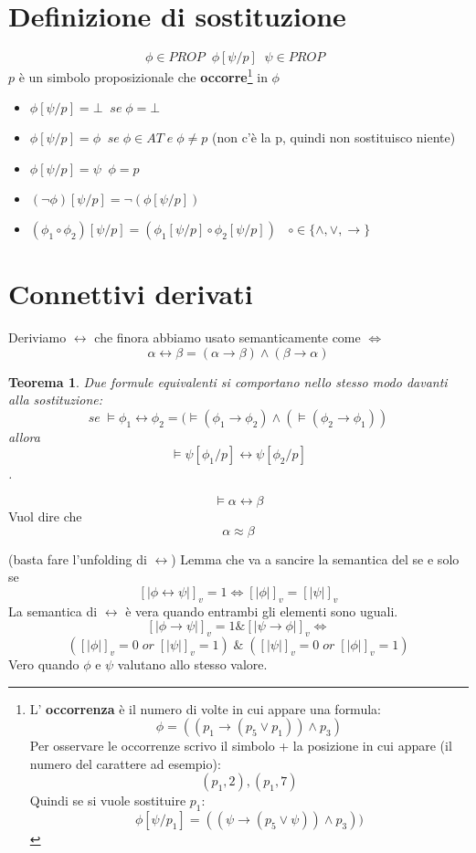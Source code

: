 \documentclass{article}
\newtheorem{theorem}{Teorema}
\theoremstyle{break}
\theoremstyle{break}
\theoremstyle{break}
\theoremstyle{break}
\begin{document}
\section{Definizione di sostituzione}
\begin{definition}
   \[
       \phi \in PROP\;\; \phi[\psi/p]\;\; \psi \in PROP\;\;
   \]  
   \( p \) è un simbolo proposizionale che \textbf{occorre}\footnote{L' \textbf{occorrenza} è il numero di volte
   in cui appare una formula:
\[
   \phi=((p_1 \to (p_5 \vee p_1))\wedge p_3)
\] 
Per osservare le occorrenze scrivo il simbolo + la posizione in cui appare (il numero del carattere ad esempio):
\[
    (p_1, 2), (p_1, 7)
\]
Quindi se si vuole sostituire \( p_1 \): \[ \phi[\psi/p_1] = ((\psi \to (p_5 \vee \psi))\wedge p_3)) \]
} in \( \phi \)
\begin{itemize}
    \item \( \phi[\psi/p] = \bot\;\; se\; \phi = \bot \)
    \item \( \phi[\psi/p] = \phi\;\; se\;\phi \in AT\; e\; \phi \neq p \) (non c'è la p, quindi non sostituisco niente)
    \item \( \phi[\psi/p] = \psi\;\; \phi = p \) 
    \item \( (\neg \phi)[\psi/p] =  \neg (\phi[\psi/p])\) 
    \item \( (\phi_1 \circ \phi_2)[\psi/p]=(\phi_1[\psi/p] \circ \phi_2[\psi/p]) \)  \(\;\; \circ \in  \{ \wedge, \vee, \to  \} \) 
\end{itemize}
\end{definition}

\section{Connettivi derivati}
Deriviamo \( \leftrightarrow \) che finora abbiamo usato semanticamente come \( \Leftrightarrow \) 
\[
\alpha \leftrightarrow \beta = (\alpha \to \beta) \wedge (\beta \to \alpha)
\] 
\begin{theorem}
    Due formule equivalenti si comportano nello stesso modo davanti alla sostituzione:
    \[
    se\; \models \phi_1 \leftrightarrow \phi_2 = (\models (\phi_1 \to \phi_2) \wedge (\models (\phi_2 \to \phi_1))
    \] 
    allora
    \[
        \models \psi[\phi_1/p] \leftrightarrow \psi[\phi_2/p]
    \].
\end{theorem}
\[
    \models \alpha \leftrightarrow \beta
\] Vuol dire che
\[
    \alpha \approx \beta
\] 
\begin{exercise}[a casa]
    (basta fare l'unfolding di \( \leftrightarrow \))
    Lemma che va a sancire la semantica del se e solo se
    \[
        [|\phi \leftrightarrow \psi|]_v=1 \Leftrightarrow [|\phi|]_v=[|\psi|]_v
    \] 
    La semantica di \( \leftrightarrow \) è vera quando entrambi gli elementi sono uguali. 
    \[
        [|\phi \to \psi|]_v=1 \& [|\psi \to \phi|]_v \Leftrightarrow
    \] 
    \[
        ([|\phi|]_v=0\; or\; [|\psi|]_v=1)\; \&\; ([|\psi|]_v=0\; or\; [|\phi|]_v=1) 
    \] 
    Vero quando \( \phi \) e \( \psi \) valutano allo stesso valore.
\end{exercise}
\end{document}
